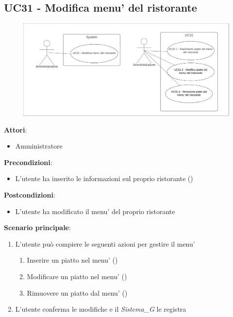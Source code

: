 \subsection{UC31 - Modifica menu' del ristorante}\label{usecase:31}
\begin{figure}[H]
    \centering
    \includegraphics[width=0.9\linewidth]{ucd/UCD31.png}
\end{figure}
\textbf{Attori}:
\begin{itemize}
    \item Amministratore
\end{itemize}
\textbf{Precondizioni}:
\begin{itemize}
    \item L'utente ha inserito le informazioni sul proprio ristorante ()
\end{itemize}
\textbf{Postcondizioni}:
\begin{itemize}
    \item L'utente ha modificato il menu' del proprio ristorante
\end{itemize}
\textbf{Scenario principale}:
\begin{enumerate}
    \item L'utente può compiere le seguenti azioni per gestire il menu'
    \begin{enumerate}
        \item Inserire un piatto nel menu' ()
        \item Modificare un piatto nel menu' ()
        \item Rimuovere un piatto dal menu' ()
    \end{enumerate}
    \item L'utente conferma le modifiche e il \textit{Sistema_G} le registra
\end{enumerate}